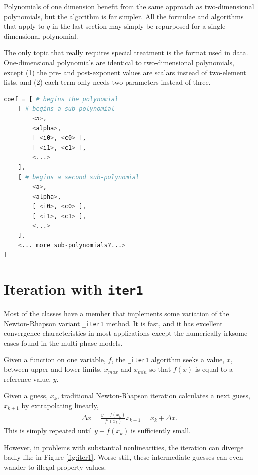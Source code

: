 Polynomials of one dimension benefit from the same approach as two-dimensional polynomials, but the algorithm is far simpler.  All the formulae and algorithms that apply to $q$ in the last section may simply be repurposed for a single dimensional polynomial.  

The only topic that really requires special treatment is the format used in data.  One-dimensional polynomials are identical to two-dimensional polynomials, except (1) the pre- and post-exponent values are scalars instead of two-element lists, and (2) each term only needs two parameters instead of three.

\begin{lstlisting}[language=Python]
coef = [ # begins the polynomial
    [ # begins a sub-polynomial
        <a>, 
        <alpha>,
        [ <i0>, <c0> ],
        [ <i1>, <c1> ],
        <...>
    ],
    [ # begins a second sub-polynomial
        <a>, 
        <alpha>,
        [ <i0>, <c0> ],
        [ <i1>, <c1> ],
        <...>
    ],
    <... more sub-polynomials?...>
]
\end{lstlisting}

\section{Iteration with \texttt{iter1}}\label{sec:num:iter1}

Most of the classes have a member that implements some variation of the Newton-Rhapson variant \verb|_iter1| method.  It is fast, and it has excellent convergence characteristics in most applications except the numerically irksome cases found in the multi-phase models.

Given a function on one variable, $f$, the \verb|_iter1| algorithm seeks a value, $x$, between upper and lower limits, $x_{max}$ and $x_{min}$ so that $f(x)$ is equal to a reference value, $y$.  

Given a guess, $x_k$, traditional Newton-Rhapson iteration calculates a next guess, $x_{k+1}$ by extrapolating linearly,
\begin{align}
\Delta x = \frac{y-f(x_k)}{f'(x_k)}
x_{k+1} = x_k + \Delta x.
\end{align}
This is simply repeated until $y-f(x_k)$ is sufficiently small.

However, in problems with substantial nonlinearities, the iteration can diverge badly like in Figure \ref{fig:iter1}.  Worse still, these intermediate guesses can even wander to illegal property values.

